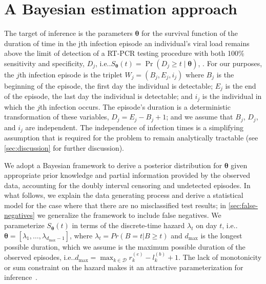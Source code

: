 \documentclass[referee,useAMS,usenatbib]{biom}
\makeatletter
\DeclareMathOperator{\prob}{\mathrm{Pr}}
\newcommand\set{\mathcal}
\renewcommand{\vec}[1]{\bm{#1}}
\newcommand{\dmax}{d_\text{max}}
\DeclareRobustCommand\onedot{\futurelet\@let@token\@onedot}
\def\@onedot{\ifx\@let@token.\else.\null\fi\xspace}
\def\ie{i.e\onedot} \def\Ie{{I.e}\onedot}
\makeatother
\begin{document}
\section{A Bayesian estimation approach} \label{sec:modelling}

The target of inference is the parameters $\vec{\theta}$ for the survival function of the duration of time in the jth infection episode an individual's viral load remains above the limit of detection of a RT-PCR testing procedure with both 100\% sensitivity and specificity, $D_j$, \ie $S_{\vec{\theta}}(t) = \prob(D_j \geq t \mid \vec\theta)$, .
For our purposes, the $j$th  infection episode is the triplet $W_j = (B_j, E_j, i_j)$ where $B_j$ is the beginning of the episode, the first day the individual is detectable; $E_j$ is the end of the episode, the last day the individual is detectable; and $i_j$ is the individual in which the $j$th infection occurs.
The episode's duration is a deterministic transformation of these variables, $D_j = E_j - B_j + 1$; and we assume that $B_j$, $D_j$, and $i_j$ are independent.
The independence of infection times is a simplifying assumption that is required for the problem to remain analytically tractable (see  \cref{sec:discussion} for further discussion).

We adopt a Bayesian framework to derive a posterior distribution for $\vec{\theta}$ given appropriate prior knowledge and partial information provided by the observed data, accounting for the doubly interval censoring and undetected episodes.
In what follows, we explain the data generating process and derive a statistical model for the case where that there are no misclassified test results; in \cref{sec:false-negatives} we generalize the framework to include false negatives.
We parameterize $S_{\vec{\theta}}(t)$ in terms of the discrete-time hazard $\lambda_t$  on day $t$, \ie ${\vec{\theta}}=[\lambda_1, \dots, \lambda_{\dmax-1}]$, where $\lambda_t = Pr(B = t | B \geq t)$ and $\dmax$ is the longest possible duration, which we assume is the maximum possible duration of the observed episodes, \ie $\dmax = \max_{k \in \set{D}} r^{(e)}_k - l^{(b)}_k + 1$.
The lack of monotonicity or sum constraint on the hazard makes it an attractive parameterization for inference~\citep{heBayesian}.
\end{document}
